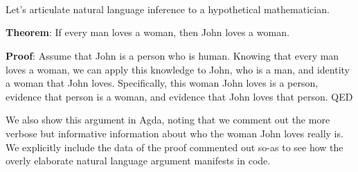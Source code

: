 \begin{code}[hide]%
\>[0]\AgdaSpace{}%
\AgdaSymbol{=}\AgdaSpace{}%
\AgdaSpace{}%
\AgdaSymbol{(}\AgdaSpace{}%
\AgdaSymbol{)}\AgdaSpace{}%
\AgdaSymbol{(}\AgdaSpace{}%
\AgdaSpace{}%
\AgdaSymbol{(}\AgdaSpace{}%
\AgdaSymbol{))}\<%
\\
\>[0]\AgdaSpace{}%
\AgdaSymbol{=}\AgdaSpace{}%
\AgdaSpace{}%
\AgdaSymbol{(}\AgdaSpace{}%
\AgdaSymbol{)}\AgdaSpace{}%
\AgdaSymbol{(}\AgdaSpace{}%
\AgdaSpace{}%
\AgdaSymbol{(}\AgdaSpace{}%
\AgdaSymbol{))}\<%
\\
\>[0]\AgdaSpace{}%
\AgdaSymbol{=}\AgdaSpace{}%
\AgdaSpace{}%
\AgdaSpace{}%
\AgdaSymbol{(}\AgdaSpace{}%
\AgdaSpace{}%
\AgdaSymbol{(}\AgdaSpace{}%
\AgdaSymbol{))}\<%
\\
\>[0]\AgdaSpace{}%
\AgdaSymbol{=}\AgdaSpace{}%
\AgdaSpace{}%
\AgdaSpace{}%
\AgdaSymbol{(}\AgdaSpace{}%
\AgdaSpace{}%
\AgdaSymbol{(}\AgdaSpace{}%
\AgdaSymbol{))}\<%
\end{code}


Let's articulate natural language inference to a hypothetical mathematician.

\textbf{Theorem}:
  If every man loves a woman, then John loves a woman.

\textbf{Proof}:
Assume that John is a person who is human. Knowing that every man
  loves a woman, we can apply this knowledge to John, who is a man, and identity a
woman that John loves. Specifically, this woman John loves is a person, evidence
that person is a woman, and evidence that John loves that person. {QED}

We also show this argument in Agda, noting that we comment out the more verbose
but informative information about who the woman John loves really is. We
explicitly include the data of the proof commented out so-as to see how the
overly elaborate natural language argument manifests in code.

